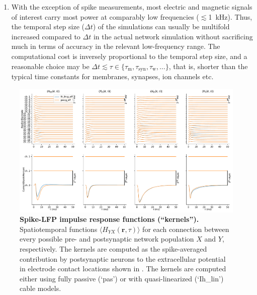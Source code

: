 \begin{enumerate}
\item With the exception of spike measurements, most electric and magnetic signals of interest carry most power at comparably low frequencies ($\lesssim$\SI{1}{\kilo\hertz}).
Thus, the temporal step size ($\Delta t$) of the simulations can usually be multifold increased compared to $\Delta t$ in the actual network simulation without sacrificing much in terms of accuracy in the relevant low-frequency range.
The computational cost is inversely proportional to the temporal step size,
and a reasonable choice may be $\Delta t \lesssim \tau \in \{ \tau_\mathrm{m}, \tau_\mathrm{syn}, \tau_\mathrm{w}, \ldots \}$,
that is, shorter than the typical time constants for membranes, synapses, ion channels etc.

\end{enumerate}




\begin{figure}[!ht]
\begin{center}
\includegraphics[width=\textwidth]{Figures/Ch-LFPy/Ch-LFPy-kernels.pdf}
\end{center}
\caption{\textbf{Spike-LFP impulse response functions (``kernels'').}
Spatiotemporal functions $\langle H_{YX}(\mathbf{r}, \tau) \rangle$ for each connection between every possible pre- and postsynaptic network population $X$ and $Y$, respectively.
The kernels are computed as the spike-averaged contribution by postsynaptic neurons to the extracellular potential in electrode contact locations shown in .
The kernels are computed either using fully passive (`pas') or with quasi-linearized (`Ih\_lin') cable models.
}
\label{fig:LFPy_kernels}
\end{figure}


